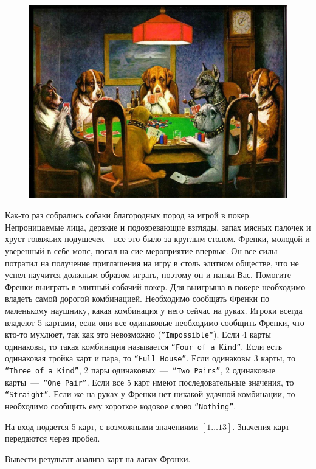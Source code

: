 \begin{figure}[h!]
	\centering
	\includegraphics[width=0.8\linewidth, keepaspectratio]{poker.jpg}
\end{figure}

Как-то раз собрались собаки благородных пород за игрой в покер. 
Непроницаемые лица, дерзкие и подозревающие взгляды, запах мясных палочек и хруст говяжьих подушечек – все это было за круглым столом. 
Френки, молодой и уверенный в себе мопс, попал на сие мероприятие впервые. 
Он все силы потратил на получение приглашения на игру в столь элитном обществе, что не успел научится должным образом играть, поэтому он и нанял Вас. 
Помогите Френки выиграть в элитный собачий покер. Для выигрыша в покере необходимо владеть самой дорогой комбинацией. 
Необходимо сообщать Френки по маленькому наушнику, какая комбинация у него сейчас на руках. 
Игроки всегда владеют 5 картами, если они все одинаковые необходимо сообщить Френки, что кто-то мухлюет, так как это невозможно (\texttt{''Impossible``}). 
Если 4 карты одинаковы, то такая комбинация называется \texttt{``Four of a Kind''}. 
Если есть одинаковая тройка карт и пара, то \texttt{``Full House''}. 
Если одинаковы 3 карты, то \texttt{``Three of a Kind''}, 2 пары одинаковых~---~\texttt{``Two Pairs''}, 2 одинаковые карты~---~\texttt{``One Pair''}. 
Если все 5 карт имеют последовательные значения, то \texttt{``Straight''}. 
Если же на руках у Френки нет никакой удачной комбинации, то необходимо сообщить ему короткое кодовое слово \texttt{``Nothing''}.

\InputFile
\noindent

На вход подается 5 карт, с возможными значениями $[1 \ldots 13]$. Значения карт передаются через пробел.

\OutputFile
\noindent

Вывести результат анализа карт на лапах Фрэнки.

\SAMPLES